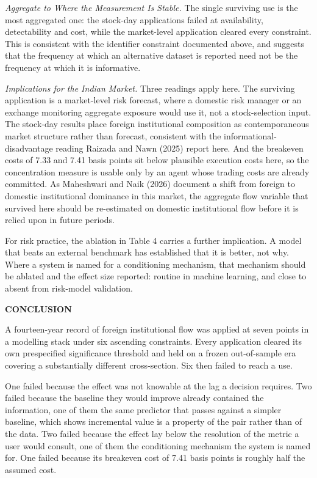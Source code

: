 \documentclass[12pt,a4paper]{article}
\newcommand{\mainhead}[1]{%
  \par\vspace{10pt}\noindent\textbf{\MakeUppercase{#1}}\par\vspace{2pt}}
\begin{document}
\textit{Aggregate to Where the Measurement Is Stable.} The single surviving use is the most aggregated one: the stock-day applications failed at availability, detectability and cost, while the market-level application cleared every constraint. This is consistent with the identifier constraint documented above, and suggests that the frequency at which an alternative dataset is reported need not be the frequency at which it is informative.

\textit{Implications for the Indian Market.} Three readings apply here. The surviving application is a market-level risk forecast, where a domestic risk manager or an exchange monitoring aggregate exposure would use it, not a stock-selection input. The stock-day results place foreign institutional composition as contemporaneous market structure rather than forecast, consistent with the informational-disadvantage reading Raizada and Nawn (2025) report here. And the breakeven costs of 7.33 and 7.41 basis points sit below plausible execution costs here, so the concentration measure is usable only by an agent whose trading costs are already committed. As Maheshwari and Naik (2026) document a shift from foreign to domestic institutional dominance in this market, the aggregate flow variable that survived here should be re-estimated on domestic institutional flow before it is relied upon in future periods.

For risk practice, the ablation in Table 4 carries a further implication. A model that beats an external benchmark has established that it is better, not why. Where a system is named for a conditioning mechanism, that mechanism should be ablated and the effect size reported: routine in machine learning, and close to absent from risk-model validation.

\mainhead{CONCLUSION}

A fourteen-year record of foreign institutional flow was applied at seven points in a modelling stack under six ascending constraints. Every application cleared its own prespecified significance threshold and held on a frozen out-of-sample era covering a substantially different cross-section. Six then failed to reach a use.

One failed because the effect was not knowable at the lag a decision requires. Two failed because the baseline they would improve already contained the information, one of them the same predictor that passes against a simpler baseline, which shows incremental value is a property of the pair rather than of the data. Two failed because the effect lay below the resolution of the metric a user would consult, one of them the conditioning mechanism the system is named for. One failed because its breakeven cost of 7.41 basis points is roughly half the assumed cost.
\end{document}
